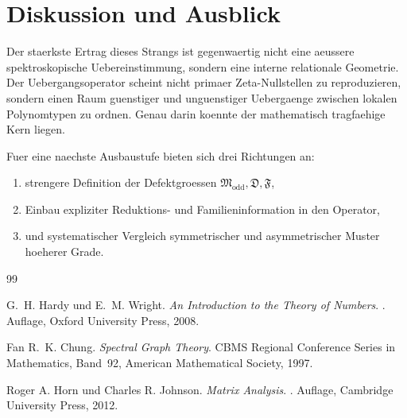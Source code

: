 \documentclass[11pt,a4paper]{article}
\theoremstyle{definition}
\begin{document}
\section{Diskussion und Ausblick}

Der staerkste Ertrag dieses Strangs ist gegenwaertig nicht eine aeussere spektroskopische Uebereinstimmung, sondern eine interne relationale Geometrie. Der Uebergangsoperator scheint nicht primaer Zeta-Nullstellen zu reproduzieren, sondern einen Raum guenstiger und unguenstiger Uebergaenge zwischen lokalen Polynomtypen zu ordnen. Genau darin koennte der mathematisch tragfaehige Kern liegen.

Fuer eine naechste Ausbaustufe bieten sich drei Richtungen an:
\begin{enumerate}[leftmargin=2em]
\item strengere Definition der Defektgroessen \(\mathfrak M_{\mathrm{odd}},\mathfrak D,\mathfrak F\),
\item Einbau expliziter Reduktions- und Familieninformation in den Operator,
\item und systematischer Vergleich symmetrischer und asymmetrischer Muster hoeherer Grade.
\end{enumerate}

\begin{thebibliography}{99}

G.~H. Hardy und E.~M. Wright.
\newblock \emph{An Introduction to the Theory of Numbers}.
. Auflage, Oxford University Press, 2008.

Fan R.~K. Chung.
\newblock \emph{Spectral Graph Theory}.
\newblock CBMS Regional Conference Series in Mathematics, Band~92,
American Mathematical Society, 1997.

Roger A. Horn und Charles R. Johnson.
\newblock \emph{Matrix Analysis}.
. Auflage, Cambridge University Press, 2012.

\end{thebibliography}
\end{document}
